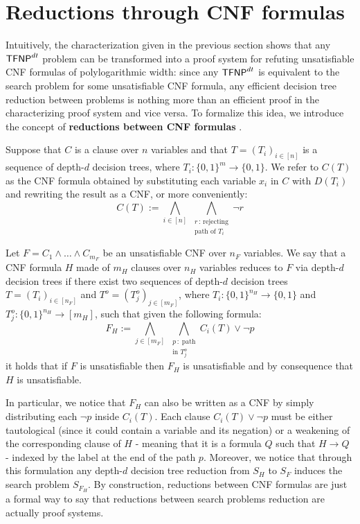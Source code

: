 \quad

\section{Reductions through CNF formulas}

Intuitively, the characterization given in the previous section shows that any $\mathsf{TFNP}^{dt}$ problem can be transformed into a proof system for refuting unsatisfiable CNF formulas of polylogarithmic width: since any $\mathsf{TFNP}^{dt}$ is equivalent to the search problem for some unsatisfiable CNF formula, any efficient decision tree reduction between problems is nothing more than an efficient proof in the characterizing proof system and vice versa. To formalize this idea, we introduce the concept of \textbf{reductions between CNF formulas} \cite{tfnp_characterization}.

Suppose that $C$ is a clause over $n$ variables and that $T = (T_i)_{i \in [n]}$ is a sequence of depth-$d$ decision trees, where $T_i : \{0,1\}^{m} \to \{0,1\}$. We refer to $C(T)$ as the CNF formula obtained by substituting each variable $x_i$ in $C$ with $D(T_i)$ and rewriting the result as a CNF, or more conveniently:
\[C(T) := \bigwedge_{i \in [n]} \, \bigwedge_{\substack{r \,:\, \text{rejecting} \\ \text{path of $T_i$}}} \lnot{r}\]

\newpage

\begin{definition}
 Let $F = C_1 \land \ldots \land C_{m_F}$ be an unsatisfiable CNF over $n_F$ variables. We say that a CNF formula $H$ made of $m_H$ clauses over $n_H$ variables reduces to $F$ via depth-$d$ decision trees if there exist two sequences of depth-$d$ decision trees $T = (T_i)_{i \in [n_F]}$ and $T^o = (T_j^o)_{j \in [m_F]}$, where $T_i : \{0,1\}^{n_H} \to \{0,1\}$ and $T_j^o : \{0,1\}^{n_H} \to [m_H]$, such that given the following formula:
    \[F_H := \bigwedge_{j \in [m_F]} \,\bigwedge_{\substack{p \,:\; \text{path} \\ \text{in } T_j^o}} C_i(T) \lor \lnot{p}\]
 it holds that if $F$ is unsatisfiable then $F_H$ is unsatisfiable and by consequence that $H$ is unsatisfiable. 
\end{definition}

In particular, we notice that $F_H$ can also be written as a CNF by simply distributing each $\lnot{p}$ inside $C_i(T)$. Each clause $C_i(T) \lor \lnot{p}$ must be either tautological (since it could contain a variable and its negation) or a weakening of the corresponding clause of $H$ - meaning that it is a formula $Q$ such that $H \to Q$ - indexed by the label at the end of the path $p$. Moreover, we notice that through this formulation any depth-$d$ decision tree reduction from $S_H$ to $S_F$ induces the search problem $S_{F_H}$. By construction, reductions between CNF formulas are just a formal way to say that reductions between search problems reduction are actually proof systems.

